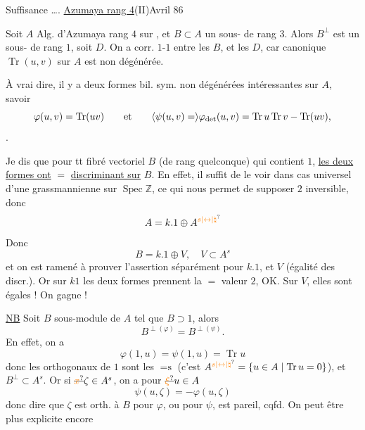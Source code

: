 Suffisance  \ldots.
\uline{Azumaya rang 4}\hfill (II)\hfill Avril 86

Soit $A$ Alg. d'Azumaya rang $4$ sur  , et $B\subset A$ un sous-  de rang $3$. Alors $B^\perp$ est un sous-  de rang $1$, soit $D$. On a corr. $1$-$1$ entre les $B$, et les $D$, car  canonique $\operatorname{Tr}(u,v)$ sur $A$ est non dégénérée.

À vrai dire, il y a deux formes bil. sym. non dégénérées intéressantes sur $A$, savoir
\[
\varphi(u,v)=\operatorname{Tr}(uv)\qquad\text{et}\qquad\inserted{\psi(u,v)=}\varphi_{\det}(u,v)=\operatorname{Tr}u\operatorname{Tr}v-\operatorname{Tr}(uv),
\]
 .

Je dis que pour tt fibré vectoriel $B$ (de rang quelconque) qui contient $1$, \uline{les deux formes ont} $=$ \uline{discriminant sur} $B$. En effet, il suffit de le voir dans cas universel d'une grassmannienne sur $\operatorname{Spec}\mathbb{Z}$, ce qui nous permet de supposer $2$ inversible, donc
\[
A=k.1\oplus A^{\unsure{s|\leftrightarrow|\natural}}
\]
Donc
\[
B=k.1\oplus V,\quad V\subset A^s
\]
et  on est ramené à prouver l'assertion  séparément pour $k.1$, et $V$ (égalité des discr.). Or sur $k1$ les deux formes   prennent la $=$ valeur $2$, OK. Sur $V$,  elles sont égales ! On gagne !


\uline{NB} Soit $B$ sous-module de $A$ tel que $B\supset1$, alors
\[
B^{\perp(\varphi)}=B^{\perp(\psi)}.
\]
En effet,   on a
\[
\varphi(1,u)=\psi(1,u)=\operatorname{Tr}u
\]
donc les orthogonaux de $1$ sont les $=\text{s}$ (c'est $A^{\unsure{s|\leftrightarrow|\natural}}=\{u\in A\mid\operatorname{Tr}u=0\}$), et $B^\perp\subset A^s$. Or si $\deleted{\unsure{x}}\zeta\in A^s$, on a pour   $\deleted{\unsure{\xi}}u\in A$
\[
\psi(u,\zeta)=-\varphi(u,\zeta)
\]
donc dire que $\zeta$ est orth. à $B$ pour $\varphi$, ou pour $\psi$, est pareil, cqfd.
On peut être plus explicite encore

